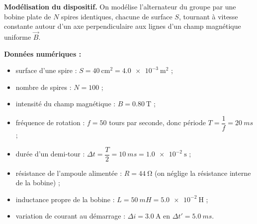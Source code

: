 \documentclass[11pt]{article}
\newcommand{\cle}[1]{{\popxbold\color{popdark}#1}}
\begin{document}
\textbf{Modélisation du dispositif.} On modélise l'alternateur du groupe par une \cle{bobine plate} de $N$ spires identiques, chacune de surface $S$, tournant à vitesse constante autour d'un axe perpendiculaire aux lignes d'un champ magnétique uniforme $\vec{B}$.

\textbf{Données numériques :}
\begin{itemize}
\item surface d'une spire : $S = 40~\text{cm}^2 = \num{4,0e-3}~\text{m}^2$ ;
\item nombre de spires : $N = 100$ ;
\item intensité du champ magnétique : $B = \num{0,80}~\text{T}$ ;
\item fréquence de rotation : $f = 50$ tours par seconde, donc période $T = \dfrac{1}{f} = \SI{20}{ms}$ ;
\item durée d'un demi-tour : $\Delta t = \dfrac{T}{2} = \SI{10}{ms} = \num{1,0e-2}~\text{s}$ ;
\item résistance de l'ampoule alimentée : $R = \SI{44}{\ohm}$ (on néglige la résistance interne de la bobine) ;
\item inductance propre de la bobine : $L = \SI{50}{mH} = \num{5,0e-2}~\text{H}$ ;
\item variation de courant au démarrage : $\Delta i = \num{3,0}~\text{A}$ en $\Delta t' = \SI{5,0}{ms}$.
\end{itemize}
\end{document}
